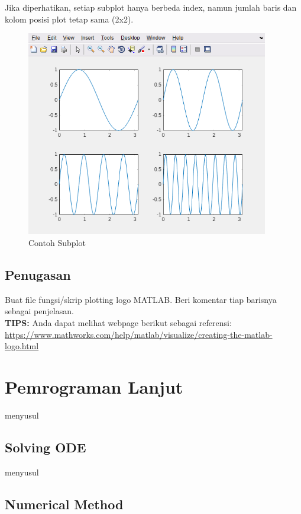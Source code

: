 \documentclass[12pt]{book}
\begin{document}
	Jika diperhatikan, setiap subplot hanya berbeda index, namun jumlah baris dan kolom posisi plot tetap sama (2x2).

	\begin{figure}[!ht]
		\centering
		\includegraphics[width=300pt]{images/subplot}
		\caption{Contoh Subplot}
	\end{figure}

	\newpage
	\section{Penugasan}
	
	Buat file fungsi/skrip plotting logo MATLAB.
	Beri komentar tiap barisnya sebagai penjelasan.\\
	
	\textbf{TIPS:} Anda dapat melihat webpage berikut sebagai referensi:\\
	\url{https://www.mathworks.com/help/matlab/visualize/creating-the-matlab-logo.html}
	
	\newpage
	\chapter{Pemrograman Lanjut}
	
	menyusul
	
	\section{Solving ODE}
	
	menyusul
	
	\section{Numerical Method}
	
\end{document}

